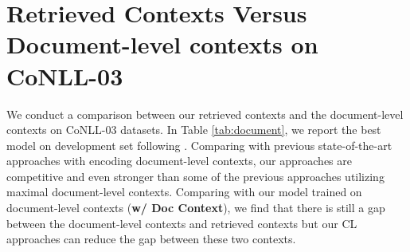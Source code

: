 \documentclass[11pt,a4paper]{article}
\begin{document}
\section{Retrieved Contexts Versus Document-level contexts on CoNLL-03}
\label{app:versus}
We conduct a comparison between our retrieved contexts and the document-level contexts on CoNLL-03 datasets. In Table \ref{tab:document}, we report the best model on development set following \citet{yamada-etal-2020-luke}. Comparing with previous state-of-the-art approaches with encoding document-level contexts, our approaches are competitive and even stronger than some of the previous approaches utilizing maximal document-level contexts. Comparing with our model trained on document-level contexts ({\sc\textbf{w/ Doc Context}}), we find that there is still a gap between the document-level contexts and retrieved contexts but our CL approaches can reduce the gap between these two contexts.
% 
% 
\end{document}
